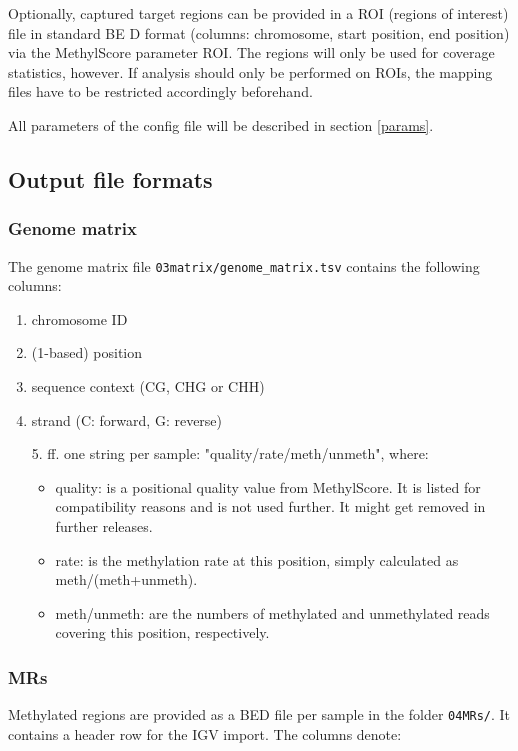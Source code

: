 \documentclass{article}
\begin{document}
Optionally, captured target regions can be provided in a ROI (regions of interest) file in standard BE D format (columns: chromosome, start position, end position) via the MethylScore parameter ROI. The regions will only be used for coverage statistics, however. If analysis should only be performed on ROIs, the mapping files have to be restricted accordingly beforehand.

All parameters of the config file will be described in section \ref{params}.

  
\subsection{Output file formats}

\subsubsection*{Genome matrix}

The genome matrix file \verb|03matrix/genome_matrix.tsv| contains the following columns:
\begin{enumerate}
	\item chromosome ID
	\item (1-based) position
	\item sequence context (CG, CHG or CHH)
	\item strand (C: forward, G: reverse)
	\item [5. ff.] one string per sample: "quality/rate/meth/unmeth", where:
		\begin{itemize}
			\item quality: is a positional quality value from MethylScore. It is listed for compatibility reasons and is not used further. It might get removed in further releases.
			\item rate: is the methylation rate at this position, simply calculated as meth/(meth+unmeth).
			\item meth/unmeth: are the numbers of methylated and unmethylated reads covering this position, respectively.
		\end{itemize}
\end{enumerate}

\subsubsection*{MRs}

Methylated regions are provided as a BED file per sample in the folder \verb|04MRs/|. It contains a header row for the IGV import. The columns denote:
\end{document}
